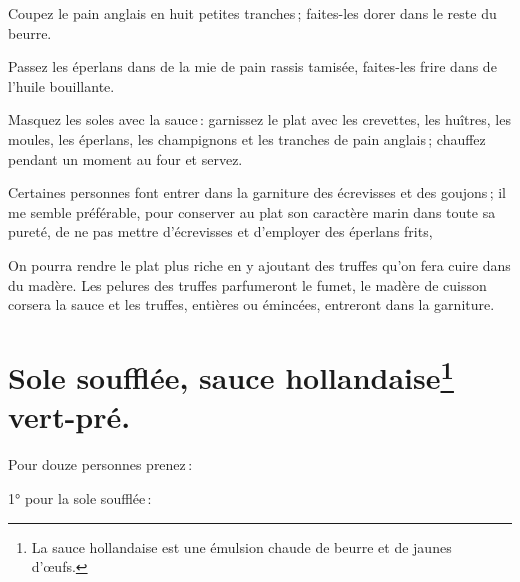 Coupez le pain anglais en huit petites tranches ; faites-les dorer dans le
reste du beurre.

Passez les éperlans dans de la mie de pain rassis tamisée, faites-les frire dans
de l'huile bouillante.

Masquez les soles avec la sauce : garnissez le plat avec les crevettes, les
huîtres, les moules, les éperlans, les champignons et les tranches de pain
anglais ; chauffez pendant un moment au four et servez.

\sk

Certaines personnes font entrer dans la garniture des écrevisses et des goujons ;
il me semble préférable, pour conserver au plat son caractère marin dans toute
sa pureté, de ne pas mettre d'écrevisses et d'employer des éperlans frits,

\sk

On pourra rendre le plat plus riche en y ajoutant des truffes qu'on fera cuire
dans du madère. Les pelures des truffes parfumeront le fumet, le madère de
cuisson corsera la sauce et les truffes, entières ou émincées, entreront dans
la garniture.

\section*{\centering Sole soufflée, sauce hollandaise\footnote{
                    La sauce hollandaise est une émulsion chaude de beurre et de
                    jaunes d'œufs.} vert-pré.}

Pour douze personnes prenez :


\medskip

1° pour la sole soufflée :

\medskip


